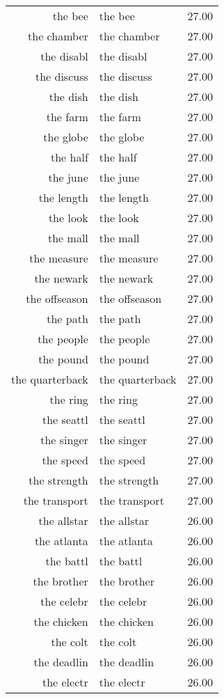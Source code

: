 \begin{table}[ht]
\begin{tabular}{rlr}
  the bee & the bee & 27.00 \\ 
  the chamber & the chamber & 27.00 \\ 
  the disabl & the disabl & 27.00 \\ 
  the discuss & the discuss & 27.00 \\ 
  the dish & the dish & 27.00 \\ 
  the farm & the farm & 27.00 \\ 
  the globe & the globe & 27.00 \\ 
  the half & the half & 27.00 \\ 
  the june & the june & 27.00 \\ 
  the length & the length & 27.00 \\ 
  the look & the look & 27.00 \\ 
  the mall & the mall & 27.00 \\ 
  the measure & the measure & 27.00 \\ 
  the newark & the newark & 27.00 \\ 
  the offseason & the offseason & 27.00 \\ 
  the path & the path & 27.00 \\ 
  the people & the people & 27.00 \\ 
  the pound & the pound & 27.00 \\ 
  the quarterback & the quarterback & 27.00 \\ 
  the ring & the ring & 27.00 \\ 
  the seattl & the seattl & 27.00 \\ 
  the singer & the singer & 27.00 \\ 
  the speed & the speed & 27.00 \\ 
  the strength & the strength & 27.00 \\ 
  the transport & the transport & 27.00 \\ 
  the allstar & the allstar & 26.00 \\ 
  the atlanta & the atlanta & 26.00 \\ 
  the battl & the battl & 26.00 \\ 
  the brother & the brother & 26.00 \\ 
  the celebr & the celebr & 26.00 \\ 
  the chicken & the chicken & 26.00 \\ 
  the colt & the colt & 26.00 \\ 
  the deadlin & the deadlin & 26.00 \\ 
  the electr & the electr & 26.00 \\ 

\end{tabular}
\end{table}
